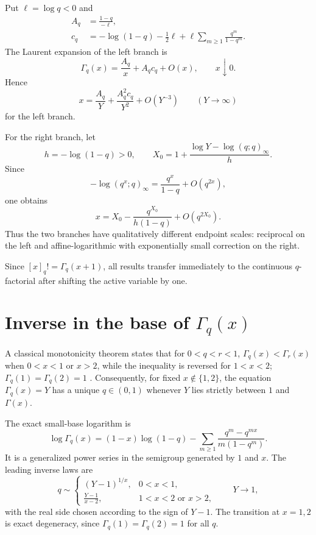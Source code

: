 \documentclass[11pt,a4paper,oneside,openany]{book}
\theoremstyle{definition}
\theoremstyle{remark}
\begin{document}
Put \(\ell=\log q<0\) and
\begin{align}
 A_q&=\frac{1-q}{-\ell},\label{eq:Aq}\\
 c_q&=-\log(1-q)-\frac12\ell
 +\ell\sum_{m\ge1}\frac{q^m}{1-q^m}.
\label{eq:cq}
\end{align}
The Laurent expansion of the left branch is
\begin{equation}\label{eq:qgamma-zero-forward}
 \Gamma_q(x)=\frac{A_q}{x}+A_qc_q+O(x),\qquad x\downarrow0.
\end{equation}
Hence
\begin{equation}\label{eq:qgamma-left-inverse}
 x=\frac{A_q}{Y}+\frac{A_q^2c_q}{Y^2}+O(Y^{-3})
 \qquad(Y\to\infty)
\end{equation}
for the left branch.

For the right branch, let
\[
 h=-\log(1-q)>0,
 \qquad
 X_0=1+\frac{\log Y-\log(q;q)_\infty}{h}.
\]
Since
\[
 -\log(q^x;q)_\infty=\frac{q^x}{1-q}+O(q^{2x}),
\]
one obtains
\begin{equation}\label{eq:qgamma-right-inverse}
 x=X_0-\frac{q^{X_0}}{h(1-q)}+O(q^{2X_0}).
\end{equation}
Thus the two branches have qualitatively different endpoint scales:
reciprocal on the left and affine-logarithmic with exponentially small
correction on the right.

Since \([x]_q!=\Gamma_q(x+1)\), all results transfer immediately to the
continuous \(q\)-factorial after shifting the active variable by one.

\section{Inverse in the base of \texorpdfstring{$\Gamma_q(x)$}{Gamma q(x)}}

A classical monotonicity theorem states that for \(0<q<r<1\),
\(\Gamma_q(x)<\Gamma_r(x)\) when \(0<x<1\) or \(x>2\), while the inequality
is reversed for \(1<x<2\); \(\Gamma_q(1)=\Gamma_q(2)=1\)
\cite{DLMFqGamma,Kocic1990}.  Consequently, for fixed
\(x\notin\{1,2\}\), the equation \(\Gamma_q(x)=Y\) has a unique
\(q\in(0,1)\) whenever \(Y\) lies strictly between \(1\) and \(\Gamma(x)\).

The exact small-base logarithm is
\begin{equation}\label{eq:qgamma-small-q-log}
 \log\Gamma_q(x)
 =(1-x)\log(1-q)
 -\sum_{m\ge1}\frac{q^m-q^{mx}}{m(1-q^m)}.
\end{equation}
It is a generalized power series in the semigroup generated by \(1\) and
\(x\).  The leading inverse laws are
\begin{equation}\label{eq:qgamma-small-q-inverses}
 q\sim
 \begin{cases}
  (Y-1)^{1/x},&0<x<1,\\[1mm]
  \displaystyle\frac{Y-1}{x-2},&1<x<2\text{ or }x>2,
 \end{cases}
 \qquad Y\to1,
\end{equation}
with the real side chosen according to the sign of \(Y-1\).  The transition
at \(x=1,2\) is exact degeneracy, since \(\Gamma_q(1)=\Gamma_q(2)=1\) for
all \(q\).
\end{document}
